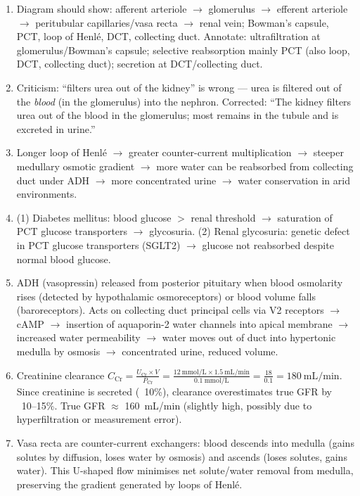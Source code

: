 \documentclass[11pt]{article}
\begin{document}
\begin{corrige}[Exercise 5]
\begin{enumerate}
\item Diagram should show: afferent arteriole $\to$ glomerulus $\to$ efferent arteriole $\to$ peritubular capillaries/vasa recta $\to$ renal vein; Bowman's capsule, PCT, loop of Henlé, DCT, collecting duct. Annotate: ultrafiltration at glomerulus/Bowman's capsule; selective reabsorption mainly PCT (also loop, DCT, collecting duct); secretion at DCT/collecting duct.
\item Criticism: ``filters urea out of the kidney'' is wrong — urea is filtered out of the \emph{blood} (in the glomerulus) into the nephron. Corrected: ``The kidney filters urea out of the blood in the glomerulus; most remains in the tubule and is excreted in urine.''
\item Longer loop of Henlé $\to$ greater counter-current multiplication $\to$ steeper medullary osmotic gradient $\to$ more water can be reabsorbed from collecting duct under ADH $\to$ more concentrated urine $\to$ water conservation in arid environments.
\item (1) Diabetes mellitus: blood glucose $>$ renal threshold $\to$ saturation of PCT glucose transporters $\to$ glycosuria. (2) Renal glycosuria: genetic defect in PCT glucose transporters (SGLT2) $\to$ glucose not reabsorbed despite normal blood glucose.
\item ADH (vasopressin) released from posterior pituitary when blood osmolarity rises (detected by hypothalamic osmoreceptors) or blood volume falls (baroreceptors). Acts on collecting duct principal cells via V2 receptors $\to$ cAMP $\to$ insertion of aquaporin-2 water channels into apical membrane $\to$ increased water permeability $\to$ water moves out of duct into hypertonic medulla by osmosis $\to$ concentrated urine, reduced volume.
\item Creatinine clearance $C_{\text{Cr}} = \frac{U_{\text{Cr}} \times V}{P_{\text{Cr}}} = \frac{12\ \mathrm{mmol/L} \times 1.5\ \mathrm{mL/min}}{0.1\ \mathrm{mmol/L}} = \frac{18}{0.1} = 180\ \mathrm{mL/min}$. Since creatinine is secreted (~10\%), clearance overestimates true GFR by ~10--15\%. True GFR $\approx$ \SI{160}{mL/min} (slightly high, possibly due to hyperfiltration or measurement error).
\item Vasa recta are counter-current exchangers: blood descends into medulla (gains solutes by diffusion, loses water by osmosis) and ascends (loses solutes, gains water). This U-shaped flow minimises net solute/water removal from medulla, preserving the gradient generated by loops of Henlé.
\end{enumerate}
\end{corrige}
\end{document}
